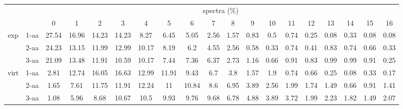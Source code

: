\documentclass{article}[12pt]
\begin{document}
\begin{landscape}
\begin{table}[h]\tiny
\vspace{3mm}
{\centering
\begin{center}
\begin{tabular}{|c|l|c|c|c|c|c|c|c|c|c|c|c|c|c|c|c|c|c|}
  \hline
  \multicolumn{2}{|c|}{ } & \multicolumn{ 17 }{|c|}{ spectra (\%)} \\
  \cline{3- 19}
  \multicolumn{2}{|c|}{ }  & 0 & 1 & 2 & 3 & 4 & 5 & 6 & 7 & 8 & 9 & 10 & 11 & 12 & 13 & 14 & 15 & 16\\
  \hline
  \multirow{3}{*}{exp}
&  1-aa  & 27.54 & 16.96 & 14.23 & 14.23 & 8.27 & 6.45 & 5.05 & 2.56 & 1.57 & 0.83 & 0.5 & 0.74 & 0.25 & 0.08 & 0.33 & 0.08 & 0.08\\
&  2-aa  & 24.23 & 13.15 & 11.99 & 12.99 & 10.17 & 8.19 & 6.2 & 4.55 & 2.56 & 0.58 & 0.33 & 0.74 & 0.41 & 0.83 & 0.74 & 0.66 & 0.33\\
&  3-aa  & 21.09 & 13.48 & 11.91 & 10.59 & 10.17 & 7.44 & 7.36 & 6.37 & 2.73 & 1.16 & 0.66 & 0.91 & 0.83 & 0.99 & 0.99 & 0.91 & 0.25\\
 \hline
  \multirow{3}{*}{virt} 
&  1-aa  & 2.81 & 12.74 & 16.05 & 16.63 & 12.99 & 11.91 & 9.43 & 6.7 & 3.8 & 1.57 & 1.9 & 0.74 & 0.66 & 0.25 & 0.08 & 0.33 & 0.17\\
&  2-aa  & 1.65 & 7.61 & 11.75 & 11.91 & 12.24 & 11 & 10.84 & 8.6 & 6.95 & 3.89 & 2.56 & 1.99 & 1.74 & 1.49 & 0.66 & 0.91 & 1.41\\
&  3-aa  & 1.08 & 5.96 & 8.68 & 10.67 & 10.5 & 9.93 & 9.76 & 9.68 & 6.78 & 4.88 & 3.89 & 3.72 & 1.99 & 2.23 & 1.82 & 1.49 & 2.07\\
 \hline
\end{tabular}
\end{center}
\par}
\centering
\vspace{3mm}
\end{table}


\end{landscape}
\end{document}
